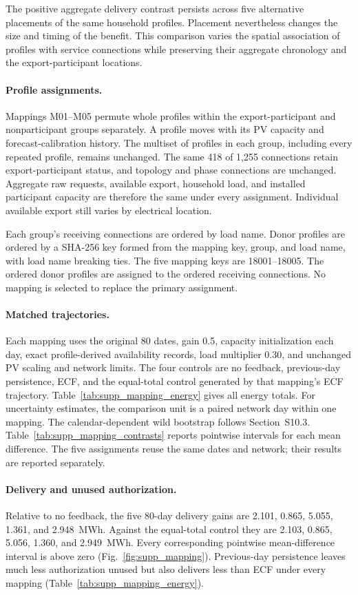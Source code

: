 \documentclass[11pt]{article}
\begin{document}
The positive aggregate delivery contrast persists across five alternative
placements of the same household profiles. Placement nevertheless changes
the size and timing of the benefit. This comparison varies the spatial
association of profiles with service connections while preserving their
aggregate chronology and the export-participant locations.

\paragraph{Profile assignments.}
Mappings M01--M05 permute whole profiles within the export-participant and
nonparticipant groups separately. A profile moves with its PV capacity and
forecast-calibration history. The multiset of profiles in each group,
including every repeated profile, remains unchanged. The same 418 of 1,255
connections retain export-participant status, and topology and phase
connections are unchanged. Aggregate raw requests, available export,
household load, and installed participant capacity are therefore the same
under every assignment. Individual available export still varies by
electrical location.

Each group's receiving connections are ordered by load name. Donor profiles are ordered
by a SHA-256 key formed from the mapping key, group, and load name, with
load name breaking ties. The five mapping keys are 18001--18005. The ordered
donor profiles are assigned to the ordered receiving connections. No mapping
is selected to replace the primary assignment.

\paragraph{Matched trajectories.}
Each mapping uses the original 80 dates, gain 0.5, capacity initialization
each day, exact profile-derived availability records, load multiplier 0.30,
and unchanged PV scaling and network limits. The four controls are no
feedback, previous-day persistence, ECF, and the equal-total control generated
by that mapping's ECF trajectory. Table~\ref{tab:supp_mapping_energy} gives
all energy totals. For uncertainty estimates, the comparison unit is a paired
network day within one mapping. The calendar-dependent wild bootstrap follows
Section~S10.3. Table~\ref{tab:supp_mapping_contrasts}
reports pointwise intervals for each mean difference. The five assignments
reuse the same dates and network; their results are reported separately.

\paragraph{Delivery and unused authorization.}
Relative to no feedback, the five 80-day delivery gains are 2.101, 0.865,
5.055, 1.361, and 2.948~MWh. Against the equal-total control they are 2.103,
0.865, 5.056, 1.360, and 2.949~MWh. Every corresponding pointwise mean-difference
interval is above zero (Fig.~\ref{fig:supp_mapping}). Previous-day persistence
leaves much less authorization unused but also delivers less than ECF under
every mapping (Table~\ref{tab:supp_mapping_energy}).
\end{document}
